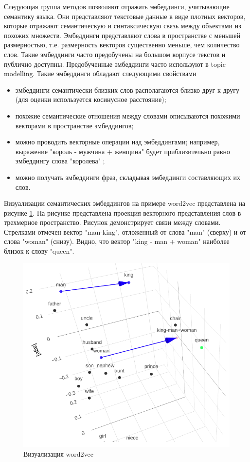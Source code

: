 Следующая группа методов позволяют отражать эмбеддинги, учитывающие семантику языка. Они представляют текстовые данные в виде плотных векторов, которые отражают семантическую и синтаксическую связь между  объектами из похожих множеств. Эмбеддинги представляют слова в пространстве с меньшей размерностью, т.е. размерность векторов существенно меньше, чем количество слов. Такие эмбеддинги часто предобучены на большом корпусе текстов и публично доступны. Предобученные эмбеддинги часто используют в  topic modelling. Такие эмбеддинги обладают следующими свойствами
\begin{itemize}
    \item эмбеддинги семантически близких слов располагаются близко друг к другу (для оценки используется косинусное расстояние);
    \item похожие семантические отношения между словами описываются похожими векторами в пространстве эмбеддингов;
    \item можно проводить векторные операции над эмбеддингами; например, выражение "король - мужчина + женщина" будет приблизительно равно эмбеддингу слова "королева" \cite{word2vec};
    \item можно получать эмбеддинги фраз, складывая эмбеддинги составляющих их слов.
\end{itemize}

Визуализации семантических эмбеддингов на примере word2vec представлена на рисунке \ref{img:word2vec-demo}. На рисунке представлена проекция векторного представления слов в трехмерное пространство. Рисунок демонстрирует связи между словами. Стрелками отмечен вектор "man-king", отложенный от слова "man" (сверху) и от слова "woman" (снизу). Видно, что вектор "king - man + woman" наиболее близок к слову "queen".

\begin{figure}[h]
    \centering
    \includegraphics[width=\linewidth]{images/word2vec-demo.png}
    \caption{Визуализация word2vec \cite{word2vec-demo}}
    \label{img:word2vec-demo}
\end{figure}

